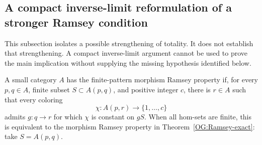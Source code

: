 \subsection{A compact inverse-limit reformulation of a stronger Ramsey condition}

This subsection isolates a possible strengthening of totality. It does
not establish that strengthening. A compact inverse-limit argument
cannot be used to prove the main implication without supplying the
missing hypothesis identified below.

\begin{definition}\label{CD:FPR}
A small category $A$ has the finite-pattern morphism Ramsey property if,
for every $p,q\in A$, finite subset $S\subset A(p,q)$, and positive
integer $c$, there is $r\in A$ such that every coloring
\[
 \chi:A(p,r)\longrightarrow\{1,\ldots,c\}
\]
admits $g:q\to r$ for which $\chi$ is constant on $gS$.
When all hom-sets are finite, this is equivalent to the morphism Ramsey
property in Theorem~\ref{OG:Ramsey-exact}: take $S=A(p,q)$.
\end{definition}

